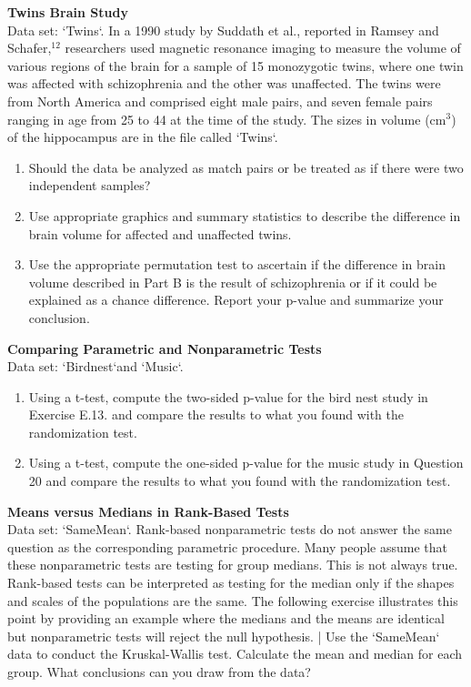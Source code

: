 \documentclass[
]{report}
\theoremstyle{definition}
\theoremstyle{definition}
\theoremstyle{definition}
\theoremstyle{definition}
\theoremstyle{remark}
\begin{document}
\begin{list}{E.}{ \setlength{\itemsep}{0.5em}}
  
  \item \textbf{Twins Brain Study} \\
  Data set: `Twins`. In a 1990 study by Suddath et al., reported in Ramsey and Schafer,$^{12}$ researchers used magnetic
resonance imaging to measure the volume of various regions of the brain for a sample of 15 monozygotic
twins, where one twin was affected with schizophrenia and the other was unaffected. The
twins were from North America and comprised eight male pairs, and seven female pairs ranging
in age from 25 to 44 at the time of the study. The sizes in volume (cm$^3$) of the hippocampus are in
the file called `Twins`.
  \begin{enumerate}
    \setcounter{enumi}{0}  
    \item Should the data be analyzed as match pairs or be treated as if there were two independent
samples?
    \item Use appropriate graphics and summary statistics to describe the difference in brain volume for
affected and unaffected twins.
    \item Use the appropriate permutation test to ascertain if the difference in brain volume described in
Part B is the result of schizophrenia or if it could be explained as a chance difference. Report
your p-value and summarize your conclusion.
  \end{enumerate}
  
  
  \item \textbf{Comparing Parametric and Nonparametric Tests} \\
  Data set: `Birdnest`and `Music`.
  \begin{enumerate}
    \setcounter{enumi}{0}  
    \item Using a t-test, compute the two-sided p-value for the bird nest study in Exercise E.13. and compare
the results to what you found with the randomization test.
    \item Using a t-test, compute the one-sided p-value for the music study in Question 20 and compare the
results to what you found with the randomization test.
  \end{enumerate}
  
  
  
  
  \item \textbf{Means versus Medians in Rank-Based Tests} \\
  Data set: `SameMean`. Rank-based nonparametric tests do not answer the same question as the corresponding parametric
procedure. Many people assume that these nonparametric tests are testing for group medians. This is
not always true. Rank-based tests can be interpreted as testing for the median only if the shapes and
scales of the populations are the same. The following exercise illustrates this point by providing an
example where the medians and the means are identical but nonparametric tests will reject the null
hypothesis.
| Use the `SameMean` data to conduct the Kruskal-Wallis test. Calculate the mean and median for
each group. What conclusions can you draw from the data?
  

\end{list}
\end{document}

